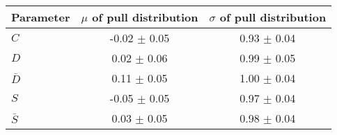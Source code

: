 \begin{tabular}{l  c  c}
\hline
Parameter & $\mu$ of pull distribution & $\sigma$ of pull distribution \\
\hline
\hline
$C$ & -0.02 $\pm$ 0.05 & 0.93 $\pm$ 0.04 \\
$D$ & 0.02 $\pm$ 0.06 & 0.99 $\pm$ 0.05 \\
$\bar{D}$ & 0.11 $\pm$ 0.05 & 1.00 $\pm$ 0.04 \\
$S$ & -0.05 $\pm$ 0.05 & 0.97 $\pm$ 0.04 \\
$\bar{S}$ & 0.03 $\pm$ 0.05 & 0.98 $\pm$ 0.04 \\
\hline
\end{tabular}
